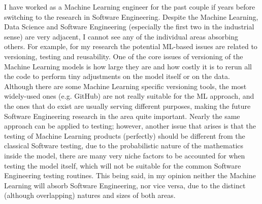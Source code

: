 \documentclass{article}
\begin{document}
I have worked as a Machine Learning engineer for the past couple if years before switching to the research in Software Engineering. Despite the Machine Learning, Data Science and Software Engineering (especially the first two in the industrial sense) are very adjacent, I cannot see any of the individual areas absorbing others. For example, for my research the potential ML-based issues are related to versioning, testing and reusability.
\newline One of the core issues of versioning of the Machine Learning models is how large they are and how costly it is to rerun all the code to perform tiny adjustments on the model itself or on the data. Although there are some Machine Learning specific versioning tools, the most widely-used ones (e.g. GitHub) are not really suitable for the ML approach, and the ones that do exist are usually serving different purposes, making the future Software Engineering research in the area quite important.
\newline Nearly the same approach can be applied to testing; however, another issue that arises is that the testing of Machine Learning products (perfectly) should be different from the classical Software testing, due to the probabilistic nature of the mathematics inside the model, there are many very niche factors to be accounted for when testing the model itself, which will not be suitable for the common Software Engineering testing routines.
\newline This being said, in my opinion neither the Machine Learning will absorb Software Engineering, nor vice versa, due to the distinct (although overlapping) natures and sizes of both areas. 
\end{document}

